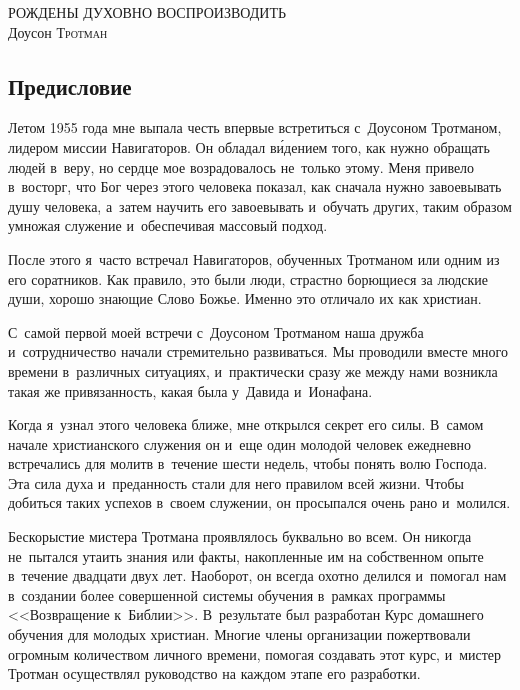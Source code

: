\documentclass[12pt,article,a4paper,fittopage]{ncc}
\begin{document}
\thispagestyle{empty}

\begin{center}
\vspace{0.5cm}
\textsc{\LARGE{РОЖДЕНЫ ДУХОВНО ВОСПРОИЗВОДИТЬ}}\\[0.3cm]
Доусон \textsc{Тротман}
\end{center}

\begin{multicols}{2}

\section*{Предисловие}

Летом 1955 года мне выпала честь впервые встретиться с~Доусоном Тротманом, лидером миссии Навигаторов. Он обладал в\'{и}дением того, как нужно обращать людей в~веру, но сердце мое возрадовалось не~только этому. Меня привело в~восторг, что Бог через этого человека показал, как сначала нужно завоевывать душу человека, а~затем научить его завоевывать и~обучать других, таким образом умножая служение и~обеспечивая массовый подход.

После этого я~часто встречал Навигаторов, обученных Тротманом или одним из его соратников. Как правило, это были люди, страстно борющиеся за людские души, хорошо знающие Слово Божье. Именно это отличало их как христиан.

С~самой первой моей встречи с~Доусоном Тротманом наша дружба и~сотрудничество начали стремительно развиваться. Мы проводили вместе много времени в~различных ситуациях, и~практически сразу же между нами возникла такая же привязанность, какая была у~Давида и~Ионафана.

Когда я~узнал этого человека ближе, мне открылся секрет его силы. В~самом начале христианского служения он и~еще один молодой человек ежедневно встречались для молитв в~течение шести недель, чтобы понять волю Господа. Эта сила духа и~преданность стали для него правилом всей жизни. Чтобы добиться таких успехов в~своем служении, он просыпался очень рано и~молился.

Бескорыстие мистера Тротмана проявлялось буквально во всем. Он никогда не~пытался утаить знания или факты, накопленные им на собственном опыте в~течение двадцати двух лет. Наоборот, он всегда охотно делился и~помогал нам в~создании более совершенной системы обучения в~рамках программы <<Возвращение к~Библии>>. В~результате был разработан Курс домашнего обучения для молодых христиан. Многие члены организации пожертвовали огромным количеством личного времени, помогая создавать этот курс, и~мистер Тротман осуществлял руководство на каждом этапе его разработки.


\end{multicols}
\end{document}

